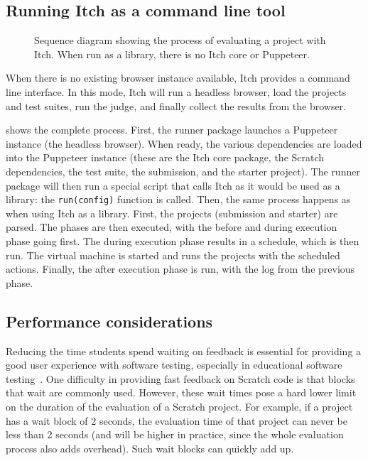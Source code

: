 \documentclass[../main]{subfiles}
\begin{document}
\subsection{Running Itch as a command line tool}\label{subsec:running-itch-as-a-command-line-tool}

\begin{figure}
    \begin{wide}
        
    \end{wide}
    \caption{Sequence diagram showing the process of evaluating a project with Itch. When run as a library, there is no Itch core or Puppeteer.}
    \label{fig:itch-sequence-diagram}
\end{figure}

When there is no existing browser instance available, Itch provides a command line interface.
In this mode, Itch will run a headless browser, load the projects and test suites, run the judge, and finally collect the results from the browser.

 shows the complete process.
First, the runner package launches a Puppeteer instance (the headless browser).
When ready, the various dependencies are loaded into the Puppeteer instance (these are the Itch core package, the Scratch dependencies, the test suite, the submission, and the starter project).
The runner package will then run a special script that calls Itch as it would be used as a library: the \texttt{run(config)} function is called.
Then, the same process happens as when using Itch as a library.
First, the projects (submission and starter) are parsed.
The phases are then executed, with the before and during execution phase going first.
The during execution phase results in a schedule, which is then run.
The virtual machine is started and runs the projects with the scheduled actions.
Finally, the after execution phase is run, with the log from the previous phase.

\subsection{Performance considerations}\label{subsec:performance-considerations}

Reducing the time students spend waiting on feedback is essential for providing a good user experience with software testing, especially in educational software testing~\autocite{sarsaSpeedingAutomatedAssessment2022}.
One difficulty in providing fast feedback on Scratch code is that blocks that wait are commonly used.
However, these wait times pose a hard lower limit on the duration of the evaluation of a Scratch project.
For example, if a project has a wait block of 2 seconds, the evaluation time of that project can never be less than 2 seconds (and will be higher in practice, since the whole evaluation process also adds overhead).
Such wait blocks can quickly add up.
\end{document}
